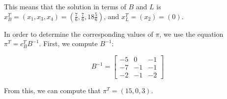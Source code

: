 \documentclass[fleqn]{homework}
\begin{document}
\begin{problem}{1}
    This means that the solution in terms of $B$ and $L$ is
    $x_B^T = (x_1, x_3, x_4) = (\frac{7}{6}, \frac{7}{6}, 18 \frac{5}{6})$, and
    $x_L^T = (x_2) = (0)$.

    In order to determine the corresponding values of $\pi$, we use the equation
    $\pi^T = c_B^T B^{-1}$.  First, we compute $B^{-1}$:

    \begin{equation}
      B^{-1} = \begin{bmatrix*} -5 & 0 & -1 \\ -7 & -1 & -1 \\ -2 & -1 & -2 \end{bmatrix*}
    \end{equation}

    From this, we can compute that $\pi^T = (15, 0, 3)$.
  \end{problem}
\end{document}
